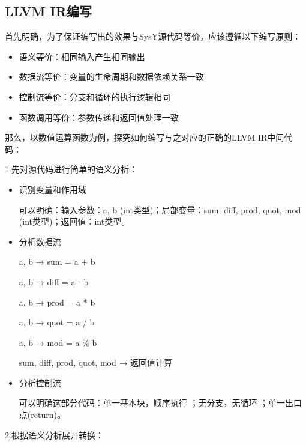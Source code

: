 \documentclass[a4paper]{article}
\begin{document}
\subsection{LLVM IR编写}
首先明确，为了保证编写出的效果与SysY源代码等价，应该遵循以下编写原则：
\begin{itemize}
	\item 语义等价：相同输入产生相同输出
	\item 数据流等价：变量的生命周期和数据依赖关系一致
	\item 控制流等价：分支和循环的执行逻辑相同
	\item 函数调用等价：参数传递和返回值处理一致
\end{itemize}

那么，以数值运算函数为例，探究如何编写与之对应的正确的LLVM IR中间代码：

1.先对源代码进行简单的语义分析：

\begin{itemize}
	\item 识别变量和作用域
	
	可以明确：输入参数：a, b (int类型)；局部变量：sum, diff, prod, quot, mod (int类型)；返回值：int类型。
	\item 分析数据流
	
	a, b → sum = a + b
	
	a, b → diff = a - b  
	
	a, b → prod = a * b
	
	a, b → quot = a / b
	
	a, b → mod = a \% b
	
	sum, diff, prod, quot, mod → 返回值计算
	\item 分析控制流
	
	可以明确这部分代码：单一基本块，顺序执行
	；无分支，无循环
	；单一出口点(return)。
\end{itemize}

2.根据语义分析展开转换：
\end{document}
